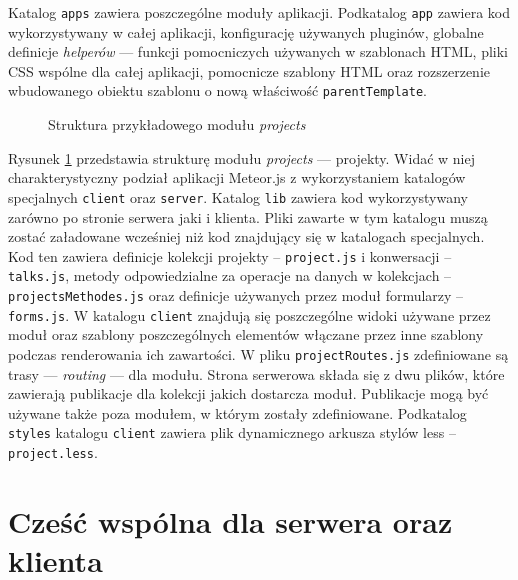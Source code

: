 Katalog \verb|apps| zawiera poszczególne moduły aplikacji. Podkatalog \verb|app| zawiera kod wykorzystywany w całej aplikacji, konfigurację używanych pluginów, globalne definicje \textit{helperów} --- funkcji pomocniczych używanych w szablonach HTML, pliki CSS wspólne dla całej aplikacji, pomocnicze szablony HTML oraz rozszerzenie wbudowanego obiektu szablonu o nową właściwość \verb|parentTemplate|.

\begin{figure}[h]
{}
  \caption{Struktura przykładowego modułu \emph{projects}}
  \label{fig:app_project_structure}
\end{figure}

Rysunek \ref{fig:app_project_structure} przedstawia strukturę modułu \emph{projects} --- projekty. Widać w niej charakterystyczny podział aplikacji Meteor.js z wykorzystaniem katalogów specjalnych \verb|client| oraz \verb|server|. Katalog \verb|lib| zawiera kod wykorzystywany zarówno po stronie serwera jaki i klienta. Pliki zawarte w tym katalogu muszą zostać załadowane wcześniej niż kod znajdujący się w katalogach specjalnych. Kod ten zawiera definicje kolekcji projekty -- \verb|project.js| i konwersacji -- \verb|talks.js|, metody odpowiedzialne za operacje na danych w kolekcjach -- \verb|projectsMethodes.js| oraz definicje używanych przez moduł formularzy -- \verb|forms.js|. W katalogu \verb|client| znajdują się poszczególne widoki używane przez moduł oraz szablony poszczególnych elementów włączane przez inne szablony podczas renderowania ich zawartości. W pliku \verb|projectRoutes.js| zdefiniowane są trasy --- \textit{routing} --- dla modułu. Strona serwerowa składa się z dwu plików, które zawierają publikacje dla kolekcji jakich dostarcza moduł. Publikacje mogą być używane także poza modułem, w którym zostały zdefiniowane. Podkatalog \verb|styles| katalogu \verb|client| zawiera plik dynamicznego arkusza stylów less -- \verb|project.less|.

\section{Cześć wspólna dla serwera oraz klienta}

